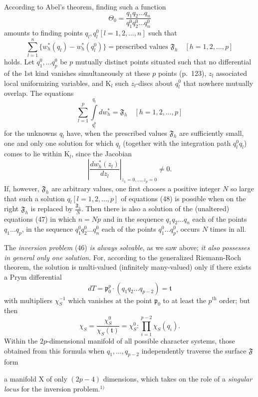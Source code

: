\documentclass{article}
\begin{document}
According to Abel's theorem, finding such a function
\[ \Theta_0 = \frac{q_1 q_2 \dots q_n}{q_1^0 q_2^0 \dots q_n^0} \]
amounts to finding points $q_l, q_l^0 [l = 1, 2, \dots, n]$ such that
\[ \sum_{l=1}^n \{ w_h^*(q_l) - w_h^*(q_l^0) \} = \text{prescribed values } \mathfrak{F}_h \quad [h = 1, 2, \dots, p] \tag{47} \]
holds. Let $q_1^0, \dots q_p^0$ be $p$ mutually distinct points situated such that no differential of the 1st kind vanishes simultaneously at these $p$ points (p.~123), $z_l$ associated local uniformizing variables, and $\mathrm{K}_l$ such $z_l$-discs about $q_l^0$ that nowhere mutually overlap. The equations
\[ \sum_{l=1}^p \int\limits_{q_l^0}^{q_l} dw_h^* = \mathfrak{F}_h \quad [h = 1, 2, \dots, p] \tag{48} \]
for the unknowns $q_l$ have, when the prescribed values $\mathfrak{F}_h$ are sufficiently small, one and only one solution for which $q_l$ (together with the integration path $q_l^0 q_l$) comes to lie within $\mathrm{K}_l$, since the Jacobian
\[ \left| \frac{dw_h^*(z_l)}{dz_l} \right|_{z_1 = 0, \dots, z_p = 0} \neq 0. \]
If, however, $\mathfrak{F}_h$ are arbitrary values, one first chooses a positive integer $N$ so large that such a solution $q_l [l = 1, 2, \dots, p]$ of equations (48) is possible when on the right $\mathfrak{F}_h$ is replaced by $\frac{\mathfrak{F}_h}{N}$. Then there is also a solution of the (unaltered) equations (47) in which $n = Np$ and in the sequence $q_1 q_2 \dots q_n$ each of the points $q_1 \dots q_p$, in the sequence $q_1^0 q_2^0 \dots q_n^0$ each of the points $q_1^0 \dots q_p^0$, occurs $N$ times in all.

The \emph{inversion problem} (46) \emph{is always solvable}, as we saw above; \emph{it also possesses in general only one solution}. For, according to the generalized Riemann-Roch theorem, the solution is multi-valued (infinitely many-valued) only if there exists a Prym differential
\[ dT = \mathfrak{p}_0^p \cdot (q_1 q_2 \dots q_{p-2}) = \mathfrak{t} \]
with multipliers $\chi_S^{-1}$ which vanishes at the point $\mathfrak{p}_0$ to at least the $p^{\text{th}}$ order; but then
\[ \chi_S = \frac{\chi_S^0}{\chi_S(\mathfrak{t})} = \chi_S^0 : \prod_{i=1}^{p-2} \chi_S(q_i). \]
Within the $2p$-dimensional manifold of all possible character systems, those obtained from this formula when $q_1, \dots, q_{p-2}$ independently traverse the surface $\mathfrak{F}$ form

a manifold $\mathrm{X}$ of only $(2p - 4)$ dimensions, which takes on the role of a \emph{singular locus} for the inversion problem.${}^{1)}$
\end{document}
